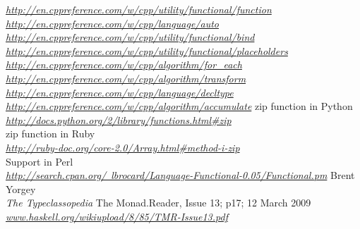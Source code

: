 \documentclass[12pt,fleqn]{article}
\begin{document}
\begin{thebibliography}{99}
\underline{\em http://en.cppreference.com/w/cpp/utility/functional/function}
\underline{\em http://en.cppreference.com/w/cpp/language/auto}
\underline{\em http://en.cppreference.com/w/cpp/utility/functional/bind}
\underline{\em http://en.cppreference.com/w/cpp/utility/functional/placeholders}
\underline{\em http://en.cppreference.com/w/cpp/algorithm/for\_each}
\underline {\em http://en.cppreference.com/w/cpp/algorithm/transform}
\underline{\em http://en.cppreference.com/w/cpp/language/decltype}
\underline{\em http://en.cppreference.com/w/cpp/algorithm/accumulate}
zip function in Python \\
\underline{\em  http://docs.python.org/2/library/functions.html\#zip}\\
zip function in Ruby \\
\underline{\em http://ruby-doc.org/core-2.0/Array.html\#method-i-zip} \\
Support in Perl \\
\underline{\em http://search.cpan.org/~lbrocard/Language-Functional-0.05/Functional.pm}  
Brent Yorgey \\
{\em The Typeclassopedia}
The Monad.Reader, Issue 13; p17; 12 March 2009
\underline{\em www.haskell.org/wikiupload/8/85/TMR-Issue13.pdf}

\end{thebibliography}
\end{document}
